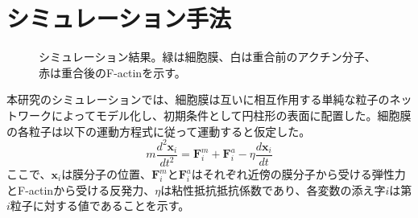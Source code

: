 \documentclass[10pt,twocolumn,a4j]{jarticle}
\begin{document}
\section{シミュレーション手法}
\begin{figure}[tbp]
\centering
 \caption{シミュレーション結果。緑は細胞膜、白は重合前のアクチン分子、赤は重合後のF-actinを示す。}
 \label{fig:res0}
\end{figure}
本研究のシミュレーションでは、細胞膜は互いに相互作用する単純な粒子のネットワークによってモデル化し、初期条件として円柱形の表面に配置した。細胞膜の各粒子は以下の運動方程式に従って運動すると仮定した。
\begin{equation}
m\frac{d^2\bm{x}_i}{dt^2} = \bm{F}^m_i +  \bm{F}^a_i - \eta \frac{d\bm{x}_i}{dt}
\end{equation}
ここで、$\bm{x}_i$は膜分子の位置、$\bm{F}^m_i$と$\bm{F}^a_i$はそれぞれ近傍の膜分子から受ける弾性力とF-actinから受ける反発力、$\eta$は粘性抵抗抵抗係数であり、各変数の添え字$i$は第$i$粒子に対する値であることを示す。
\end{document}
